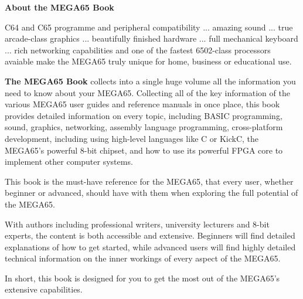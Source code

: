 \nocite{*}



\printindex

\cleardoublepage

\enlargethispage{3\baselineskip}
\thispagestyle{empty}
\pagecolor[HTML]{2244FF}

\begin{center}
\begin{minipage}{.8\textwidth}
\color{white}
\begin{center}
{ \huge\bfseries\sffamily\color{white}About the MEGA65 Book }
\end{center}

\vspace{3mm}
\hline
\vspace{3mm}

{
C64 and C65 programme and peripheral compatibility ... amazing sound ... true arcade-class graphics
... beautifully finished hardware ... full mechanical keyboard ... rich networking capabilities
and one of the fastest 6502-class processors avaiable make the MEGA65 truly unique for home, business
or educational use.  

\vspace{2mm}

{\bf The MEGA65 Book} collects into a single huge volume all the information you need to know about
your MEGA65.  Collecting all of the key information of the various MEGA65 user guides and reference
manuals in once place, this book provides detailed information on every topic, including BASIC programming,
sound, graphics, networking, assembly language programming, cross-platform development, including using
high-level languages like C or KickC, the MEGA65's powerful 8-bit chipset, and how to use its powerful
FPGA core to implement other computer systems.

\vspace{2mm}

This book is the must-have reference for the MEGA65, that every user, whether beginner or advanced, should
have with them when exploring the full potential of the MEGA65.

\vspace{2mm}

With authors including professional writers, university lecturers and 8-bit experts, the content is
both accessible and extensive.  Beginners will find detailed explanations of how to get started,
while advanced users will find highly detailed technical information on the inner workings of  every
aspect of the MEGA65.

\vspace{2mm}

In short, this book is designed for you to get the most out of the MEGA65's extensive capabilities.
}

\end{minipage}
\end{center}

